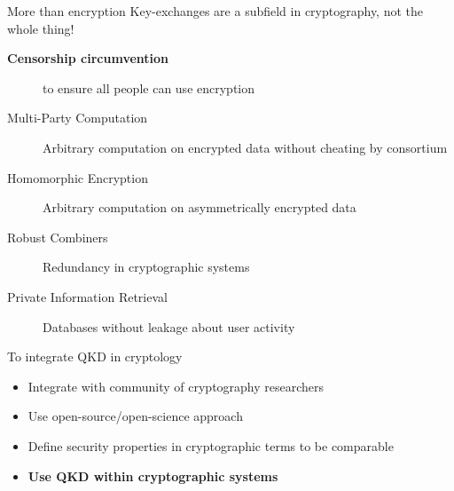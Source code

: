 \begin{frame}{More than encryption}
  \small
  Key-exchanges are a subfield in cryptography, not the whole thing!

  \begin{description}
    \item[\textbf{Censorship circumvention}] to ensure all people can use encryption
    \item[Multi-Party Computation] Arbitrary computation on encrypted data without cheating by consortium
    \item[Homomorphic Encryption] Arbitrary computation on asymmetrically encrypted data
    \item[Robust Combiners] Redundancy in cryptographic systems
    \item[Private Information Retrieval] Databases without leakage about user activity
  \end{description}
\end{frame}

\begin{frame}{To integrate QKD in cryptology}
  \small
  \begin{itemize}
    \item Integrate with community of cryptography researchers
    \item Use open-source/open-science approach
    \item Define security properties in cryptographic terms to be comparable
    \item \textbf{Use QKD within cryptographic systems}
  \end{itemize}
\end{frame}
